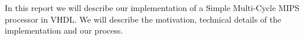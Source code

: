 In this report we will describe our implementation of a Simple Multi-Cycle MIPS processor in VHDL. We will describe the motivation, technical details of the implementation and our process.
